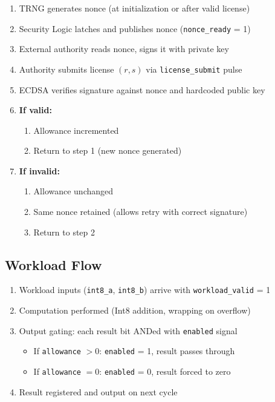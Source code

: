 \documentclass[11pt]{article}
\begin{document}
\begin{enumerate}
    \item TRNG generates nonce (at initialization or after valid license)
    \item Security Logic latches and publishes nonce (\texttt{nonce\_ready} = 1)
    \item External authority reads nonce, signs it with private key
    \item Authority submits license $(r, s)$ via \texttt{license\_submit} pulse
    \item ECDSA verifies signature against nonce and hardcoded public key
    \item \textbf{If valid:}
    \begin{enumerate}
        \item Allowance incremented
        \item Return to step 1 (new nonce generated)
    \end{enumerate}
    \item \textbf{If invalid:}
    \begin{enumerate}
        \item Allowance unchanged
        \item Same nonce retained (allows retry with correct signature)
        \item Return to step 2
    \end{enumerate}
\end{enumerate}

\subsection{Workload Flow}

\begin{enumerate}
    \item Workload inputs (\texttt{int8\_a}, \texttt{int8\_b}) arrive with \texttt{workload\_valid} = 1
    \item Computation performed (Int8 addition, wrapping on overflow)
    \item Output gating: each result bit ANDed with \texttt{enabled} signal
    \begin{itemize}
        \item If \texttt{allowance} $> 0$: \texttt{enabled} = 1, result passes through
        \item If \texttt{allowance} $= 0$: \texttt{enabled} = 0, result forced to zero
    \end{itemize}
    \item Result registered and output on next cycle
\end{enumerate}
\end{document}

